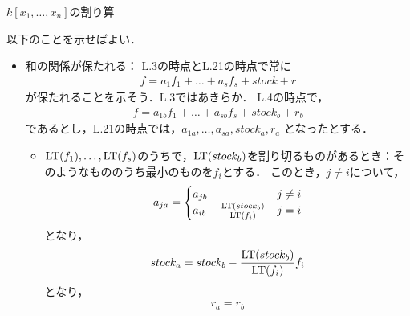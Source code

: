 \documentclass[9pt]{ltjsarticle}
\begin{document}
\begin{myproof}
 \begin{algorithm}[H]
\caption{$k[x_1,\dots,x_n]$の割り算}
  \begin{algorithmic}[1]
   \ENDIF{}
   \ENDWHILE{}
   \ENDIF{}
   \ENDWHILE{}
  \end{algorithmic}
 \end{algorithm}
以下のことを示せばよい．
 \begin{itemize}
  \item 和の関係が保たれる：
L.3の時点とL.21の時点で常に
\begin{align}
 f = a_1 f_1 + \dots + a_s f_s + stock + r
\end{align}
が保たれることを示そう．L.3ではあきらか．
L.4の時点で，
\begin{align}
 f = a_{1b} f_1 + \dots + a_{sb} f_s + stock_b + r_b
\end{align}
であるとし，L.21の時点では，$a_{1a},\dots,a_{sa},stock_{a},r_a$
となったとする．
\begin{itemize}
 \item ${\rm LT}(f_1),\dots,{\rm LT}(f_s)$のうちで，${\rm LT}(stock_b)$を割り切るものがあるとき：そのようなもののうち最小のものを$f_i$とする．
このとき，$j\neq i$について，
\begin{align}
 a_{ja} =
\begin{cases}
 a_{jb} & j\neq i\\
 a_{ib} + \frac{{\rm LT}(stock_b)}{{\rm LT}(f_i)} &  j= i
\end{cases}
\end{align}
となり，
\begin{align}
 stock_a = stock_b - \frac{{\rm LT}(stock_b)}{{\rm LT}(f_i)}f_i
\end{align}
となり，
\begin{align}
 r_a = r_b
\end{align}

\end{itemize}
\end{itemize}
\end{myproof}
\end{document}
